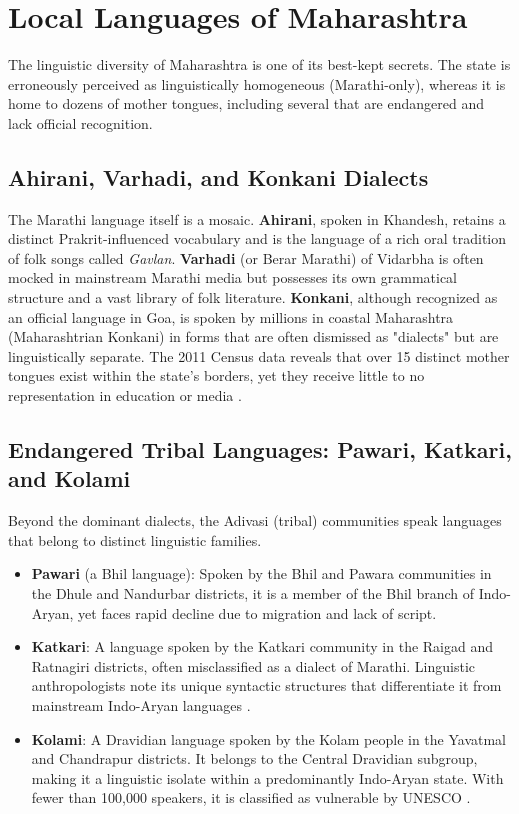 \documentclass{article}
\begin{document}
\section{Local Languages of Maharashtra}
The linguistic diversity of Maharashtra is one of its best-kept secrets. The state is erroneously perceived as linguistically homogeneous (Marathi-only), whereas it is home to dozens of mother tongues, including several that are endangered and lack official recognition.

\subsection{Ahirani, Varhadi, and Konkani Dialects}
The Marathi language itself is a mosaic. \textbf{Ahirani}, spoken in Khandesh, retains a distinct Prakrit-influenced vocabulary and is the language of a rich oral tradition of folk songs called \textit{Gavlan}. \textbf{Varhadi} (or Berar Marathi) of Vidarbha is often mocked in mainstream Marathi media but possesses its own grammatical structure and a vast library of folk literature. \textbf{Konkani}, although recognized as an official language in Goa, is spoken by millions in coastal Maharashtra (Maharashtrian Konkani) in forms that are often dismissed as "dialects" but are linguistically separate. The 2011 Census data reveals that over 15 distinct mother tongues exist within the state's borders, yet they receive little to no representation in education or media \cite{census}.

\subsection{Endangered Tribal Languages: Pawari, Katkari, and Kolami}
Beyond the dominant dialects, the Adivasi (tribal) communities speak languages that belong to distinct linguistic families.
\begin{itemize}
    \item \textbf{Pawari} (a Bhil language): Spoken by the Bhil and Pawara communities in the Dhule and Nandurbar districts, it is a member of the Bhil branch of Indo-Aryan, yet faces rapid decline due to migration and lack of script.
    \item \textbf{Katkari}: A language spoken by the Katkari community in the Raigad and Ratnagiri districts, often misclassified as a dialect of Marathi. Linguistic anthropologists note its unique syntactic structures that differentiate it from mainstream Indo-Aryan languages \cite{zide}.
    \item \textbf{Kolami}: A Dravidian language spoken by the Kolam people in the Yavatmal and Chandrapur districts. It belongs to the Central Dravidian subgroup, making it a linguistic isolate within a predominantly Indo-Aryan state. With fewer than 100,000 speakers, it is classified as vulnerable by UNESCO \cite{unesco}.
\end{itemize}
\end{document}
